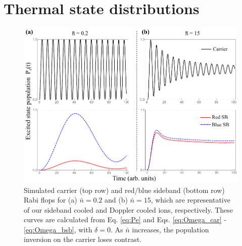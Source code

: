 
\section{Thermal state distributions}

\begin{figure}[t]
    \begin{center}
        \includegraphics{figures/2/Fig_Flopping}
        \caption{\label{fig:flopping} Simulated carrier (top row) and red/blue sideband (bottom row) Rabi flops for (a) $\bar{n} = 0.2$ and (b) $\bar{n} = 15$, which are representative of our sideband cooled and Doppler cooled ions, respectively. These curves are calculated from Eq. \ref{eq:Pe} and Eqs. \ref{eq:Omega_car} - \ref{eq:Omega_bsb}, with $\delta = 0$. As $\bar{n}$ increases, the population inversion on the carrier loses contrast.  }
    \end{center}
\end{figure}

